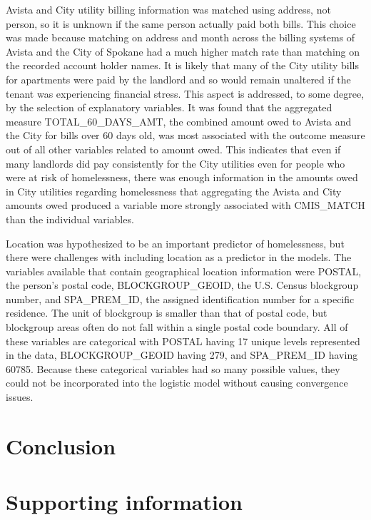 \documentclass[10pt,letterpaper]{article}
\begin{document}
Avista and City utility billing information was matched using address, not person, so it is unknown if the same person actually paid both bills. This choice was made because matching on address and month across the billing systems of Avista and the City of Spokane had a much higher match rate than matching on the recorded account holder names. It is likely that many of the City utility bills for apartments were paid by the landlord and so would remain unaltered if the tenant was experiencing financial stress. This aspect is addressed, to some degree, by the selection of explanatory variables. It was found that the aggregated measure TOTAL\_60\_DAYS\_AMT, the combined amount owed to Avista and the City for bills over 60 days old, was most associated with the outcome measure out of all other variables related to amount owed. This indicates that even if many landlords did pay consistently for the City utilities even for people who were at risk of homelessness, there was enough information in the amounts owed in City utilities regarding homelessness that aggregating the Avista and City amounts owed produced a variable more strongly associated with CMIS\_MATCH than the individual variables.

Location was hypothesized to be an important predictor of homelessness, but there were challenges with including location as a predictor in the models. The variables available that contain geographical location information were POSTAL, the person's postal code, BLOCKGROUP\_GEOID, the U.S. Census blockgroup number, and SPA\_PREM\_ID, the assigned identification number for a specific residence. The unit of blockgroup is smaller than that of postal code, but blockgroup areas often do not fall within a single postal code boundary. All of these variables are categorical with POSTAL having 17 unique levels represented in the data, BLOCKGROUP\_GEOID having 279, and SPA\_PREM\_ID having 60785. Because these categorical variables had so many possible values, they could not be incorporated into the logistic model without causing convergence issues.

\section*{Conclusion}

\section*{Supporting information}
\end{document}

